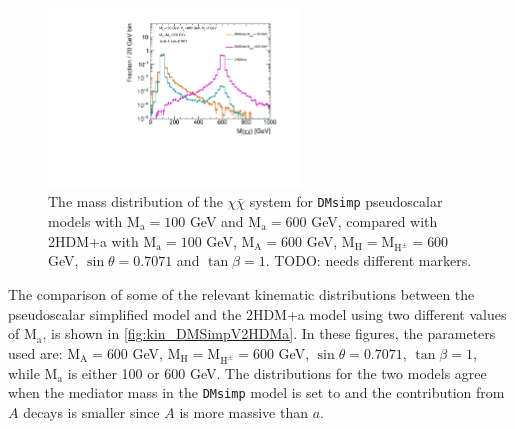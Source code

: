 \begin{figure}
  \centering
  \includegraphics[width=0.6\textwidth]{texinputs/04_grid/figures/DMHF/benchmarking/MDM_1_Ma_100_MA_600_sinp_0.7071_tanb_1.0_VS_DMSimp_100_600_Decayed/mchichi.pdf}
  \caption{The mass distribution of the $\chi\bar{\chi}$ system for \texttt{DMsimp} pseudoscalar models with $\mathrm{M_a}=100$ GeV and $\mathrm{M_a}=600$ GeV, compared with 2HDM+a with $\mathrm{M_a}=100$ GeV, $\mathrm{M_A}=600$ GeV, $\mathrm{M_H}=\mathrm{M_{H^{\pm}}}=600$ GeV, $\sin\theta=0.7071$ and $\tan\beta=1$. TODO: needs different markers.}
  \label{fig:mchichi_DMsimpV2HDMa}
\end{figure}

The comparison of some of the relevant kinematic distributions between the pseudoscalar simplified model and the 2HDM+a model using two different values of $\mathrm{M_{a}}$, is shown in \autoref{fig:kin_DMSimpV2HDMa}. In these figures, the parameters used are: $\mathrm{M_{A}}=600$ GeV, $\mathrm{M_{H}}=\mathrm{M_{H^{\pm}}}=600$ GeV, $\sin\theta=0.7071$, $\tan\beta=1$, while $\mathrm{M_{a}}$ is either 100 or 600 GeV. The distributions for the two models agree when the mediator mass in the \texttt{DMsimp} model is set to \ma and the contribution from $A$ decays is smaller since $A$ is more massive than $a$.


